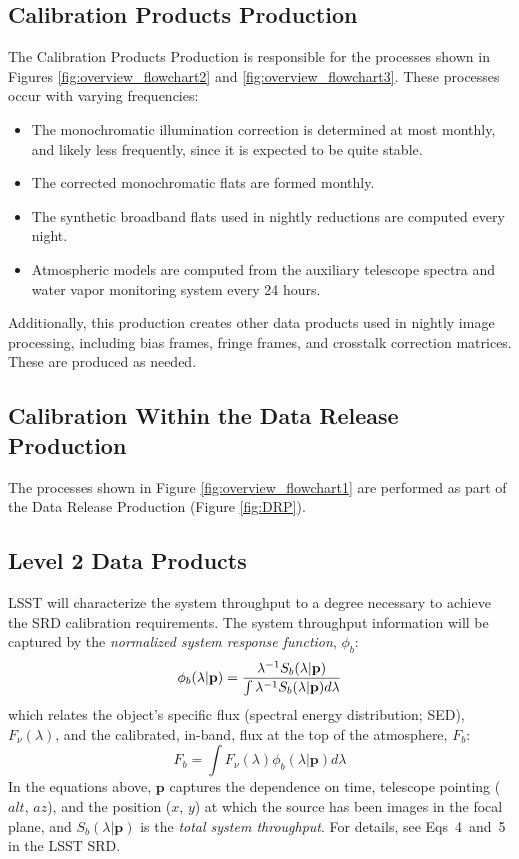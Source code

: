 \documentclass[12pt,preprint]{aastex}
\begin{document}
\subsection{Calibration Products Production}
The Calibration Products Production is responsible for the processes shown in Figures \ref{fig:overview_flowchart2}
and \ref{fig:overview_flowchart3}.  These processes occur with varying frequencies:
\begin{itemize}
\item {The monochromatic illumination correction is determined at most monthly, and likely less frequently, since
it is expected to be quite stable.}
\item{The corrected monochromatic flats are formed monthly.}
\item{The synthetic broadband flats used in nightly reductions are computed every night.}
\item{Atmospheric models are computed from the auxiliary telescope spectra and water vapor monitoring system every 24 hours.}
\end{itemize}

Additionally, this production creates other data products used in nightly image processing, including bias frames, fringe
frames, and crosstalk correction matrices.  These are produced as needed.

\subsection{Calibration Within the Data Release Production}

The processes shown in Figure \ref{fig:overview_flowchart1} are performed as part of the Data Release Production (Figure \ref{fig:DRP}).


\subsection{Level 2 Data Products}

LSST will characterize the system throughput to a degree necessary to achieve the SRD calibration requirements. The system throughput information will be captured by the {\em normalized system response function}, $\phi_b$:
%
\begin{equation}
    \phi_b(\lambda|\mathbf{p}) = {\lambda^{-1} S_b(\lambda|\mathbf{p}) \over \int \lambda^{-1} S_b(\lambda|\mathbf{p}) d\lambda}
\end{equation}
%
which relates the object's specific flux (spectral energy distribution; SED), $F_\nu(\lambda)$, and the calibrated, in-band, flux at the top of the atmosphere, $F_b$:
%
\begin{equation}
    F_b = \int F_\nu(\lambda) \phi_b(\lambda|\mathbf{p}) d\lambda
\end{equation}
In the equations above, $\mathbf{p}$ captures the dependence on time, telescope pointing ($alt$, $az$), and the position ($x$, $y$) at which the source has been images in the focal plane, and $S_b(\lambda|\mathbf{p})$ is the {\em total system throughput}. For details, see Eqs~4~and~5 in the LSST SRD.
\\
\end{document}
